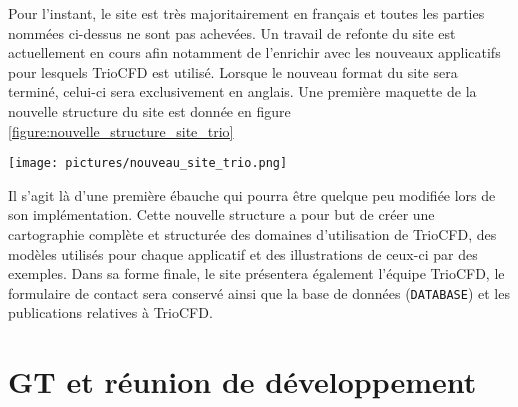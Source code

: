 Pour l'instant, le site est très majoritairement en fran\c cais et toutes les parties nommées ci-dessus ne sont pas achevées. Un travail de refonte du site est actuellement en cours afin notamment de l'enrichir avec les nouveaux applicatifs pour lesquels TrioCFD est utilisé. Lorsque le nouveau format du site sera terminé, celui-ci sera
exclusivement en anglais. Une première maquette de la nouvelle structure du site est donnée en figure \ref{figure:nouvelle_structure_site_trio}

\begin{center}
\texttt{[image: pictures/nouveau\_site\_trio.png]}
\end{center}
\begin{center}
\end{center}

Il s'agit là d'une première ébauche qui pourra être quelque peu modifiée lors de son implémentation. Cette nouvelle structure a pour but de créer une cartographie complète et structurée des domaines d'utilisation de TrioCFD, des modèles utilisés pour chaque applicatif et des illustrations de ceux-ci par des exemples. Dans sa forme finale, le site présentera également l'équipe TrioCFD, le formulaire de contact sera conservé ainsi que la base de données (\texttt{DATABASE}) et les publications relatives à TrioCFD.

\chapter{GT et réunion de développement}


